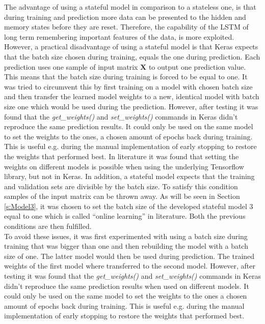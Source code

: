 The advantage of using a stateful model in comparison to a stateless one, is that during training and prediction more data can be presented to the hidden and memory states before they are reset. Therefore, the capability of the LSTM of long term remembering important features of the data, is more exploited. However, a practical disadvantage of using a stateful model is that Keras expects that the batch size chosen during training, equals the one during prediction. Each prediction uses one sample of input matrix $ \bm{X} $ to output one prediction value. This means that the batch size during training is forced to be equal to one. It was tried to circumvent this by first training on a model with chosen batch size and then transfer the learned model weights to a new, identical model with batch size one which would be used during the prediction. However, after testing it was found that the \textit{get\_weights()} and \textit{set\_weights()} commands in Keras didn't reproduce the same prediction results. It could only be used on the same model to set the weights to the ones, a chosen amount of epochs back during training. This is useful e.g. during the manual implementation of early stopping to restore the weights that performed best. In literature it was found that setting the weights on different models is possible when using the underlying Tensorflow library, but not in Keras. In addition, a stateful model expects that the training and validation sets are divisible by the batch size. To satisfy this condition samples of the input matrix can be thrown away. As will be seen in Section \ref{s:Model3}, it was chosen to set the batch size of the developed stateful model 3 equal to one which is called ``online learning'' in literature. Both the previous conditions are then fulfilled.\\


To avoid these issues, it was first experimented with using a batch size during training that was bigger than one and then rebuilding the model with a batch size of one. The latter model would then be used during prediction. The trained weights of the first model where transferred to the second model. However, after testing it was found that the \textit{get\_weights()} and \textit{set\_weights()} commands in Keras didn't reproduce the same prediction results when used on different models. It could only be used on the same model to set the weights to the ones a chosen amount of epochs back during training. This is useful e.g. during the manual implementation of early stopping to restore the weights that performed best. 

